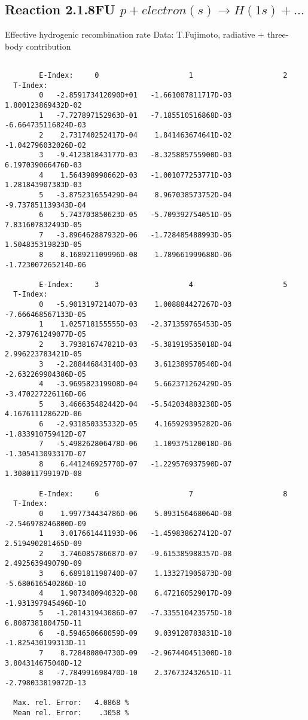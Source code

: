 \documentclass[12pt]{article}
\begin{document}
\subsection{
  Reaction 2.1.8FU $ p + electron(s) \rightarrow H(1s) + ...$
}

   Effective hydrogenic recombination rate
   Data: T.Fujimoto, radiative + three-body contribution


\begin{small}\begin{verbatim}

        E-Index:     0                     1                     2
  T-Index:
        0   -2.859173412090D+01   -1.661007811717D-03    1.800123869432D-02
        1   -7.727897152963D-01   -7.185510516868D-03   -6.664735116824D-03
        2    2.731740252417D-04    1.841463674641D-02   -1.042796032026D-02
        3   -9.412381843177D-03   -8.325885755900D-03    6.197039066476D-03
        4    1.564398998662D-03   -1.001077253771D-03    1.281843907383D-03
        5   -3.875231655429D-04    8.967038573752D-04   -9.737851139343D-04
        6    5.743703850623D-05   -5.709392754051D-05    7.831607832493D-05
        7   -3.896462887932D-06   -1.728485488993D-05    1.504835319823D-05
        8    8.168921109996D-08    1.789661999688D-06   -1.723007265214D-06

        E-Index:     3                     4                     5
  T-Index:
        0   -5.901319721407D-03    1.008884427267D-03   -7.666468567133D-05
        1    1.025718155555D-03   -2.371359765453D-05   -2.379761249077D-05
        2    3.793816747821D-03   -5.381919535018D-04    2.996223783421D-05
        3   -2.288446843140D-03    3.612389570540D-04   -2.632269904386D-05
        4   -3.969582319908D-04    5.662371262429D-05   -3.470227226116D-06
        5    3.466635482442D-04   -5.542034883238D-05    4.167611128622D-06
        6   -2.931850335332D-05    4.165929395282D-06   -1.833910759412D-07
        7   -5.498262806478D-06    1.109375120018D-06   -1.305413093317D-07
        8    6.441246925770D-07   -1.229576937590D-07    1.308011799197D-08

        E-Index:     6                     7                     8
  T-Index:
        0    1.997734434786D-06    5.093156468064D-08   -2.546978246800D-09
        1    3.017661441193D-06   -1.459838627412D-07    2.519490281465D-09
        2    3.746085786687D-07   -9.615385988357D-08    2.492563949079D-09
        3    6.689181198740D-07    1.133271905873D-08   -5.680616540286D-10
        4    1.907348094032D-08    6.472160529017D-09   -1.931397945496D-10
        5   -1.201431943086D-07   -7.335510423575D-10    6.808738180475D-11
        6   -8.594650668059D-09    9.039128783831D-10   -1.825430199313D-11
        7    8.728480804730D-09   -2.967440451300D-10    3.804314675048D-12
        8   -7.784991698470D-10    2.376732432651D-11   -2.798033819072D-13

  Max. rel. Error:   4.0868 %
  Mean rel. Error:    .3058 %

\end{verbatim}\end{small}
\end{document}
